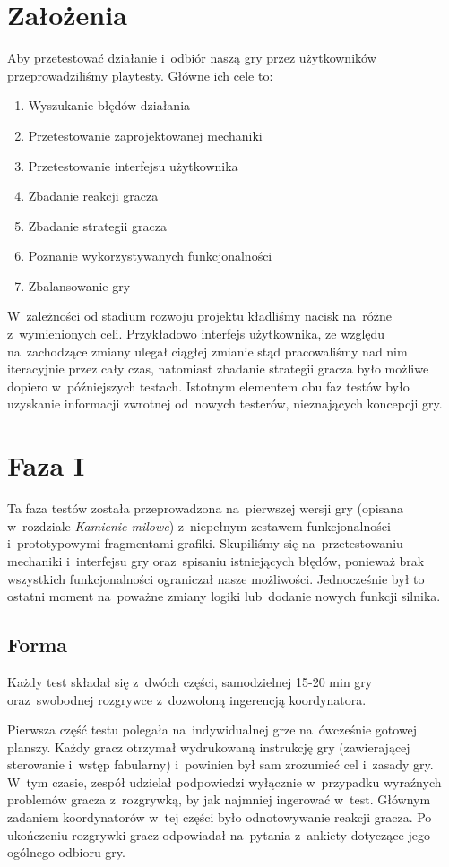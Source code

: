 \documentclass[licencjacka]{pracamgr}
\begin{document}
  \section{Założenia}
    Aby przetestować działanie i~odbiór naszą gry przez użytkowników przeprowadziliśmy playtesty. Główne ich cele to:
    \begin{enumerate}
    \item Wyszukanie błędów działania
    \item Przetestowanie zaprojektowanej mechaniki
    \item Przetestowanie interfejsu użytkownika
    \item Zbadanie reakcji gracza
    \item Zbadanie strategii gracza
    \item Poznanie wykorzystywanych funkcjonalności
    \item Zbalansowanie gry
    \end{enumerate}
    W~zależności od stadium rozwoju projektu kładliśmy nacisk na~różne z~wymienionych celi. Przykładowo interfejs użytkownika,
    ze względu na~zachodzące zmiany ulegał ciągłej zmianie stąd pracowaliśmy nad nim iteracyjnie przez cały czas, natomiast
    zbadanie strategii gracza było możliwe dopiero w~późniejszych testach. Istotnym elementem obu faz testów było uzyskanie
    informacji zwrotnej od~nowych testerów, nieznających koncepcji gry.

  \section{Faza I}
    Ta faza testów została przeprowadzona na~pierwszej wersji gry (opisana w~rozdziale \emph{Kamienie milowe})
    z~niepełnym zestawem funkcjonalności i~prototypowymi fragmentami grafiki. Skupiliśmy się na~przetestowaniu mechaniki
    i~interfejsu gry oraz~spisaniu istniejących błędów, ponieważ brak wszystkich funkcjonalności ograniczał nasze możliwości.
    Jednocześnie był to ostatni moment na~poważne zmiany logiki lub~dodanie nowych funkcji silnika.

    \subsection{Forma}
      Każdy test składał  się z~dwóch części, samodzielnej 15-20 min gry
      oraz~swobodnej rozgrywce z~dozwoloną ingerencją koordynatora.

      Pierwsza część testu polegała na~indywidualnej grze na~ówcześnie gotowej planszy.
      Każdy gracz otrzymał wydrukowaną instrukcję gry (zawierającej sterowanie i~wstęp fabularny)
      i~powinien był sam zrozumieć cel i~zasady gry. W~tym czasie, zespół udzielał podpowiedzi
      wyłącznie w~przypadku wyraźnych problemów gracza z~rozgrywką, by jak najmniej ingerować w~test.
      Głównym zadaniem koordynatorów w~tej części było odnotowywanie reakcji gracza.
      Po ukończeniu rozgrywki gracz odpowiadał na~pytania z~ankiety dotyczące jego ogólnego odbioru gry.
\end{document}
